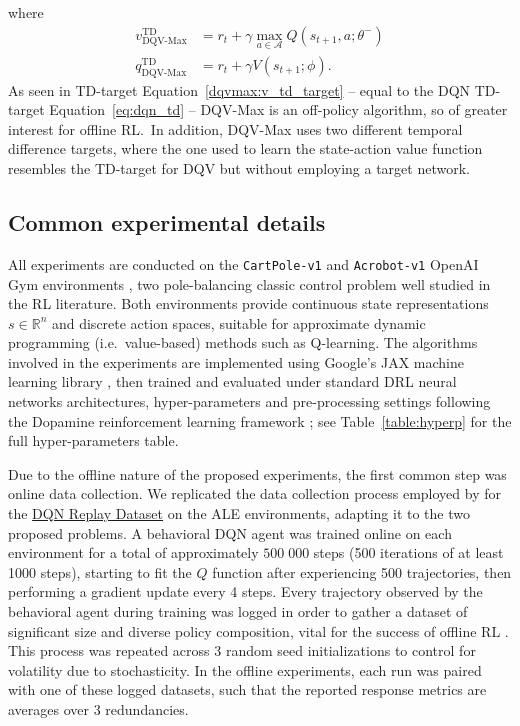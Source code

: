 where
\begin{align}
  v^{\scriptscriptstyle \textrm{TD}}_{\scriptscriptstyle
  \textrm{DQV-Max}}&=r_t+\gamma\max_{a\in\mathcal{A}}Q\left(s_{t+1},a;\theta^{-}\right)
  \label{dqvmax:v_td_target}\\
  q^{\scriptscriptstyle \textrm{TD}}_{\scriptscriptstyle \textrm{DQV-Max}}&=r_t+\gamma
  V\left(s_{t+1};\phi\right)\label{dqvmax:q_td_target}.
\end{align} As seen in TD-target
Equation~\ref{dqvmax:v_td_target} -- equal to the DQN TD-target
Equation~\ref{eq:dqn_td} -- DQV-Max is an off-policy algorithm, so
of greater interest for offline RL.\ In addition,
DQV-Max uses two different temporal difference targets, where the one
used to learn the state-action value function resembles the TD-target
for DQV but without employing a target network.

\subsection{Common experimental details}
All experiments are conducted on the
\texttt{CartPole-v1} and \texttt{Acrobot-v1} OpenAI Gym environments
\citep{https://doi.org/10.48550/arxiv.1606.01540}, two pole-balancing
classic control
problem well studied in the RL literature. Both environments
provide continuous state representations $s\in \mathbb{R}^n$ and
discrete action spaces, suitable for approximate dynamic programming
(i.e.\ value-based) methods such as Q-learning. The algorithms
involved in the experiments are implemented using Google's JAX machine
learning library \citep{jax2018github}, then trained and evaluated
under standard DRL neural networks architectures, hyper-parameters and
pre-processing settings following the Dopamine reinforcement
learning framework \citep{castro18dopamine}; see
Table~\ref{table:hyperp} for the full hyper-parameters table.

Due to the offline nature of the proposed experiments,
the first common step was online data collection. We replicated the
data collection process employed by \citet{agarwal2020optimistic} for
the \href{https://research.google/tools/datasets/dqn-replay/}{DQN
  Replay Dataset} on the ALE environments, adapting it to the two
proposed problems. A behavioral DQN agent was
trained online on each environment for a total
of approximately $500 \; 000$ steps (500 iterations of at least 1000
steps),
starting to fit the $Q$ function after experiencing 500
trajectories, then performing a gradient update every 4 steps.
Every trajectory observed by the behavioral agent during
training was logged in order to gather a dataset of significant size
and diverse policy composition, vital for the success of offline RL
\citep{agarwal2020optimistic}. This process was repeated across 3
random seed initializations to control for volatility due to
stochasticity. In the offline experiments, each run was
paired with one of these logged datasets, such that the reported
response metrics are averages over 3 redundancies.

